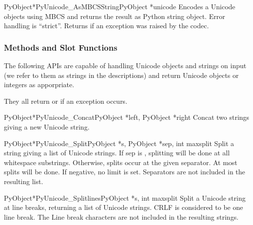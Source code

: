 \begin{cfuncdesc}{PyObject*}{PyUnicode_AsMBCSString}{PyObject *unicode}
  Encodes a Unicode objects using MBCS and returns the result as
  Python string object.  Error handling is ``strict''.  Returns
  \NULL{} if an exception was raised by the codec.
\end{cfuncdesc}


\subsubsection{Methods and Slot Functions \label{unicodeMethodsAndSlots}}

The following APIs are capable of handling Unicode objects and strings
on input (we refer to them as strings in the descriptions) and return
Unicode objects or integers as apporpriate.

They all return \NULL{} or  if an exception occurs.

\begin{cfuncdesc}{PyObject*}{PyUnicode_Concat}{PyObject *left,
                                               PyObject *right}
  Concat two strings giving a new Unicode string.
\end{cfuncdesc}

\begin{cfuncdesc}{PyObject*}{PyUnicode_Split}{PyObject *s,
                                              PyObject *sep,
                                              int maxsplit}
  Split a string giving a list of Unicode strings.  If sep is \NULL,
  splitting will be done at all whitespace substrings.  Otherwise,
  splits occur at the given separator.  At most  splits
  will be done.  If negative, no limit is set.  Separators are not
  included in the resulting list.
\end{cfuncdesc}

\begin{cfuncdesc}{PyObject*}{PyUnicode_Splitlines}{PyObject *s,
                                                   int maxsplit}
  Split a Unicode string at line breaks, returning a list of Unicode
  strings.  CRLF is considered to be one line break.  The Line break
  characters are not included in the resulting strings.
\end{cfuncdesc}

